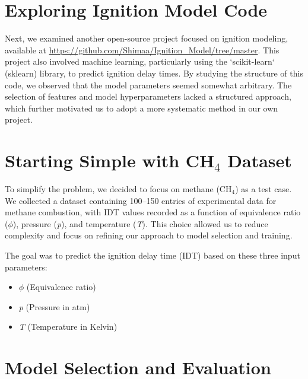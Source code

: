 \documentclass[12pt]{report}
\begin{document}
\section{Exploring Ignition Model Code}

Next, we examined another open-source project focused on ignition modeling, available at \url{https://github.com/Shimaa/Ignition_Model/tree/master}. This project also involved machine learning, particularly using the `scikit-learn` (sklearn) library, to predict ignition delay times. By studying the structure of this code, we observed that the model parameters seemed somewhat arbitrary. The selection of features and model hyperparameters lacked a structured approach, which further motivated us to adopt a more systematic method in our own project.

\section{Starting Simple with CH\(_4\) Dataset}

To simplify the problem, we decided to focus on methane (CH\(_4\)) as a test case. We collected a dataset containing 100–150 entries of experimental data for methane combustion, with IDT values recorded as a function of equivalence ratio (\(\phi\)), pressure (\textit{p}), and temperature (\textit{T}). This choice allowed us to reduce complexity and focus on refining our approach to model selection and training.

The goal was to predict the ignition delay time (IDT) based on these three input parameters: 
\begin{itemize}
    \item \(\phi\) (Equivalence ratio)
    \item \textit{p} (Pressure in atm)
    \item \textit{T} (Temperature in Kelvin)
\end{itemize}

\section{Model Selection and Evaluation}
\end{document}

